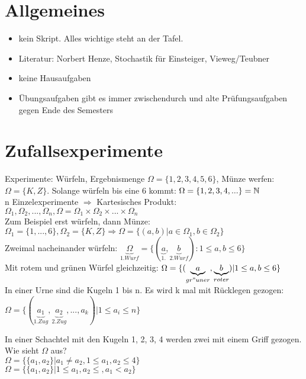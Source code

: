 \renewcommand{\ldate}{2015-10-05}

\section{Allgemeines}

\begin{itemize}
\item kein Skript. Alles wichtige steht an der Tafel.
\item Literatur: Norbert Henze, Stochastik für Einsteiger, Vieweg/Teubner
\item keine Hausaufgaben
\item Übungsaufgaben gibt es immer zwischendurch und alte Prüfungsaufgaben gegen Ende des Semesters
\end{itemize}

\section{Zufallsexperimente}

Experimente: Würfeln, Ergebnismenge $ \Omega = \{1,2,3,4,5,6\}$, Münze werfen: $ \Omega = \{K, Z\}$. Solange würfeln bis eine 6 kommt: $ \Omega = \{ 1,2,3,4,...\} = \mathbb{N} $\\
n Einzelexperimente $ \Rightarrow $ Kartesisches Produkt: $ \Omega_1, \Omega_2, ...,  \Omega_n, \Omega = \Omega_1 \times \Omega_2 \times ... \times  \Omega_n $\\
Zum Beispiel erst würfeln, dann Münze: \\
$ \Omega_1 = \{1,...,6\}, \Omega_2=\{K,Z\} \Rightarrow \Omega=\{(a,b) | a\in \Omega_1, b\in \Omega_2\}$\\
Zweimal nacheinander würfeln: $ \underbrace{\Omega}_{1. Wurf}=\{(\underbrace{a}_{1.},\underbrace{b}_{2. Wurf}) : 1 \leq a,b \leq 6 \} $\\

Mit rotem und grünen Würfel gleichzeitig: $ \Omega = \{(\underbrace{a}_{gr"uner}, \underbrace{b}_{roter}) | 1\leq a,b\leq 6\} $\\
In einer Urne sind die Kugeln 1 bis n. Es wird k mal mit Rücklegen gezogen: $ \Omega = \{(\underbrace{a_1}_{1. Zug}, \underbrace{a_2}_{2. Zug}, ..., a_k) | 1\leq a_i \leq n \}$

In einer Schachtel mit den Kugeln 1, 2, 3, 4 werden zwei mit einem Griff gezogen. Wie sieht $ \Omega $ aus?\\
$ \Omega=\{\{a_1,a_2\} | a_1 \neq a_2, 1\leq a_1,a_2\leq 4\} $\\
$ \Omega=\{\{a_1,a_2\} | 1\leq a_1, a_2\leq, a_1 < a_2 \} $\\

